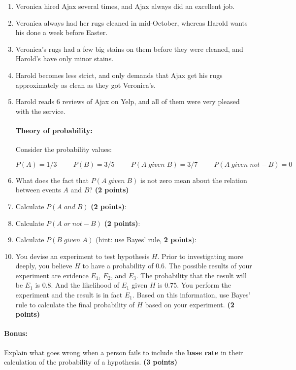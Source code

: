 \documentclass[10pt]{article}
\begin{document}
\begin{enumerate} \itemsep7mm

\item Veronica hired Ajax several times, and Ajax always did an excellent job.

\item Veronica always had her rugs cleaned in mid-October, whereas Harold wants his done a week before Easter.

\item Veronica's rugs had a few big stains on them before they were cleaned, and Harold's have only minor stains.

\item Harold becomes less strict, and only demands that Ajax get his rugs approximately as clean as they got Veronica's.

\item Harold reads 6 reviews of Ajax on Yelp, and all of them were very pleased with the service.


\paragraph{Theory of probability:} Consider the probability values: 

\[P(A) = 1/3 \hspace{1cm} P(B) = 3/5  \hspace{1cm} P(A\; given\; B) = 3/7 \hspace{1cm} P(A\; given\; not-B) = 0\]

 \itemsep7mm

 \item What does the fact that $P(A\; given\; B)$ is not zero mean about the relation between events $A$ and $B$? \textbf{(2 points)}
 
 \item Calculate $P(A\; and\; B)$ \textbf{(2 points)}:
 
 \item Calculate $P(A\; or\; not-B)$ \textbf{(2 points)}:
 
 \item Calculate $P(B\; given\; A)$ (hint: use Bayes' rule, \textbf{2 points}):
 
 \item You devise an experiment to test hypothesis $H$. Prior to investigating more deeply, you believe $H$ to have a probability of $0.6$. The possible results of your experiment are evidence $E_1$, $E_2$, and $E_3$.  The probability that the result will be $E_1$ is $0.8$. And the likelihood of $E_1$ given $H$ is $0.75$.  You perform the experiment and the result is in fact $E_1$. Based on this information, use Bayes' rule to calculate the final probability of $H$ based on your experiment. \textbf{(2 points)}
 
\end{enumerate}
  
\paragraph{Bonus:}  Explain what goes wrong when a person fails to include the \textbf{base rate} in their calculation of the probability of a hypothesis. \textbf{(3 points)}
\end{document}
